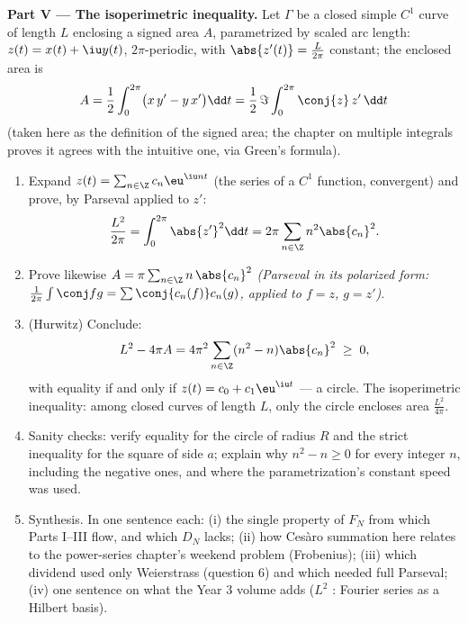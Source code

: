 \begin{problem}
\medskip
\noindent\textbf{Part V --- The isoperimetric inequality.} Let
$\Gamma$ be a closed simple $C^1$ curve of length $L$ enclosing
a signed area $A$, parametrized by scaled arc length: $z(t) =
x(t) + \iu y(t)$, $2\pi$-periodic, with $\abs{z'(t)} =
\frac{L}{2\pi}$ constant; the enclosed area is
\[
A = \frac12\int_0^{2\pi}\bigl(x\,y' - y\,x'\bigr)\dd t
= \frac{1}{2}\,\Im\int_0^{2\pi}\conj{z}\,z'\,\dd t
\]
(taken here as the definition of the signed area; the chapter
on multiple integrals proves it agrees with the intuitive one,
via Green's formula).
\begin{enumerate}[resume]
  \item Expand $z(t) = \sum_{n\in\Z}c_n\eu^{\iu nt}$ (the
        series of a $C^1$ function,  convergent) and
        prove, by Parseval applied to $z'$:
        \[
        \frac{L^2}{2\pi} = \int_0^{2\pi}\abs{z'}^2\dd t
        = 2\pi\sum_{n\in\Z}n^2\abs{c_n}^2 .
        \]
  \item Prove likewise $A = \pi\sum_{n\in\Z}
        n\,\abs{c_n}^2$ \emph{(Parseval in its polarized form:
        $\frac{1}{2\pi}\int\conj f g = \sum
        \conj{c_n(f)}c_n(g)$, applied to $f = z$, $g = z'$)}.
  \item (Hurwitz) Conclude:
        \[
        L^2 - 4\pi A = 4\pi^2\sum_{n\in\Z}
        (n^2 - n)\abs{c_n}^2 \;\geq\; 0 ,
        \]
        with equality if and only if $z(t) = c_0 +
        c_1\eu^{\iu t}$ --- a circle. The isoperimetric
        inequality: among closed curves of length $L$, only
        the circle encloses area $\frac{L^2}{4\pi}$.
  \item Sanity checks: verify equality for the circle of
        radius $R$ and the strict inequality for the square of
        side $a$; explain why $n^2 - n \geq 0$ for every
        integer $n$, including the negative ones, and where
        the parametrization's constant speed was used.
  \item Synthesis. In one sentence each: (i) the single
        property of $F_N$ from which Parts I--III flow, and
        which $D_N$ lacks; (ii) how Ces\`aro summation here
        relates to the power-series chapter's weekend problem
        (Frobenius); (iii) which dividend used only
        Weierstrass (question 6) and which needed full
        Parseval; (iv) one sentence on what the Year 3 volume
        adds ($L^2$ : Fourier series as a Hilbert
        basis).
\end{enumerate}
\end{problem}
